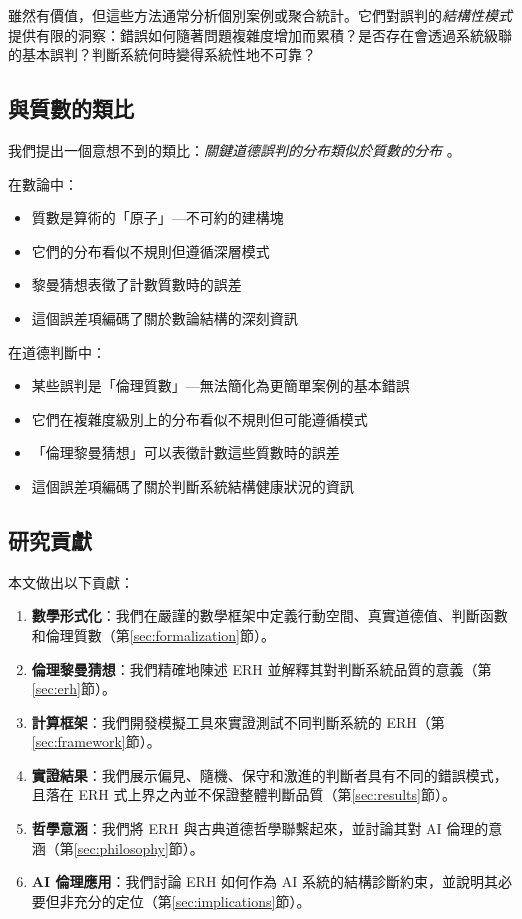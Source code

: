 \documentclass[12pt,a4paper]{article}
\theoremstyle{definition}
\theoremstyle{remark}
\begin{document}
雖然有價值，但這些方法通常分析個別案例或聚合統計。它們對誤判的\emph{結構性模式}提供有限的洞察：錯誤如何隨著問題複雜度增加而累積？是否存在會透過系統級聯的基本誤判？判斷系統何時變得系統性地不可靠？

\subsection{與質數的類比}

我們提出一個意想不到的類比：\emph{關鍵道德誤判的分布類似於質數的分布} \citep{riemann1859,edwards1974}。

在數論中：
\begin{itemize}
    \item 質數是算術的「原子」---不可約的建構塊
    \item 它們的分布看似不規則但遵循深層模式
    \item 黎曼猜想表徵了計數質數時的誤差
    \item 這個誤差項編碼了關於數論結構的深刻資訊
\end{itemize}

在道德判斷中：
\begin{itemize}
    \item 某些誤判是「倫理質數」---無法簡化為更簡單案例的基本錯誤
    \item 它們在複雜度級別上的分布看似不規則但可能遵循模式
    \item 「倫理黎曼猜想」可以表徵計數這些質數時的誤差
    \item 這個誤差項編碼了關於判斷系統結構健康狀況的資訊
\end{itemize}

\subsection{研究貢獻}

本文做出以下貢獻：

\begin{enumerate}
    \item \textbf{數學形式化}：我們在嚴謹的數學框架中定義行動空間、真實道德值、判斷函數和倫理質數（第\ref{sec:formalization}節）。
    
    \item \textbf{倫理黎曼猜想}：我們精確地陳述 ERH 並解釋其對判斷系統品質的意義（第\ref{sec:erh}節）。
    
    \item \textbf{計算框架}：我們開發模擬工具來實證測試不同判斷系統的 ERH（第\ref{sec:framework}節）。
    
    \item \textbf{實證結果}：我們展示偏見、隨機、保守和激進的判斷者具有不同的錯誤模式，且落在 ERH 式上界之內並不保證整體判斷品質（第\ref{sec:results}節）。
    
    \item \textbf{哲學意涵}：我們將 ERH 與古典道德哲學聯繫起來，並討論其對 AI 倫理的意涵（第\ref{sec:philosophy}節）。
    
    \item \textbf{AI 倫理應用}：我們討論 ERH 如何作為 AI 系統的結構診斷約束，並說明其必要但非充分的定位（第\ref{sec:implications}節）。
\end{enumerate}
\end{document}
